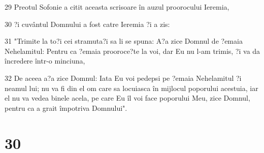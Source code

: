 \par 29 Preotul Sofonie a citit aceasta scrisoare în auzul proorocului Ieremia,
\par 30 ?i cuvântul Domnului a fost catre Ieremia ?i a zis:
\par 31 "Trimite la to?i cei stramuta?i sa li se spuna: A?a zice Domnul de ?emaia Nehelamitul: Pentru ca ?emaia prooroce?te la voi, dar Eu nu l-am trimis, ?i va da încredere într-o minciuna,
\par 32 De aceea a?a zice Domnul: Iata Eu voi pedepsi pe ?emaia Nehelamitul ?i neamul lui; nu va fi din el om care sa locuiasca în mijlocul poporului acestuia, iar el nu va vedea binele acela, pe care Eu îl voi face poporului Meu, zice Domnul, pentru ca a grait împotriva Domnului".

\chapter{30}

